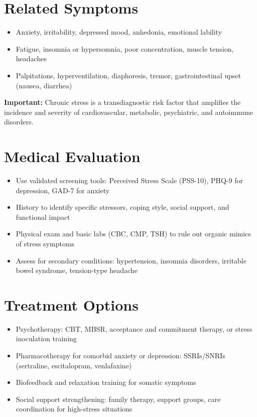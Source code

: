\section*{Related Symptoms}
\begin{itemize}
  \item Anxiety, irritability, depressed mood, anhedonia, emotional lability
  \item Fatigue, insomnia or hypersomnia, poor concentration, muscle tension, headaches
  \item Palpitations, hyperventilation, diaphoresis, tremor, gastrointestinal upset (nausea, diarrhea)
\end{itemize}
\textbf{Important:} Chronic stress is a transdiagnostic risk factor that amplifies the incidence and severity of cardiovascular, metabolic, psychiatric, and autoimmune disorders.

\section*{Medical Evaluation}
\begin{itemize}
  \item Use validated screening tools: Perceived Stress Scale (PSS-10), PHQ-9 for depression, GAD-7 for anxiety
  \item History to identify specific stressors, coping style, social support, and functional impact
  \item Physical exam and basic labs (CBC, CMP, TSH) to rule out organic mimics of stress symptoms
  \item Assess for secondary conditions: hypertension, insomnia disorders, irritable bowel syndrome, tension-type headache
\end{itemize}

\section*{Treatment Options}
\begin{itemize}
  \item Psychotherapy: CBT, MBSR, acceptance and commitment therapy, or stress inoculation training
  \item Pharmacotherapy for comorbid anxiety or depression: SSRIs/SNRIs (sertraline, escitalopram, venlafaxine)
  \item Biofeedback and relaxation training for somatic symptoms
  \item Social support strengthening: family therapy, support groups, care coordination for high-stress situations
\end{itemize}

